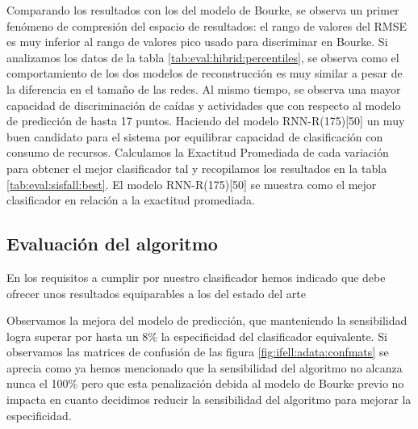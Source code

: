Comparando los resultados con los del modelo de Bourke, se observa un primer fenómeno de compresión del espacio de resultados: el rango de valores del RMSE es muy inferior al rango de valores pico usado para discriminar en Bourke. Si analizamos los datos de la tabla \ref{tab:eval:hibrid:percentiles}, se observa como el comportamiento de los dos modelos de reconstrucción es muy similar a pesar de la diferencia en el tamaño de las redes. Al mismo tiempo, se observa una mayor capacidad de discriminación de caídas y actividades que con respecto al modelo de predicción de hasta 17 puntos.  Haciendo del modelo RNN-R(175)[50] un muy buen candidato para el sistema por equilibrar capacidad de clasificación con consumo de recursos. Calculamos la Exactitud Promediada de cada variación para obtener el mejor clasificador tal y recopilamos los resultados en la tabla \ref{tab:eval:sisfall:best}. El modelo RNN-R(175)[50] se muestra como el mejor clasificador en relación a la exactitud promediada.



\subsection{Evaluación del algoritmo}




En los requisitos a cumplir por nuestro clasificador hemos indicado que debe ofrecer unos resultados equiparables a los del estado del arte 



Observamos la mejora del modelo de predicción, que manteniendo la sensibilidad logra superar por hasta un 8\% la especificidad del clasificador equivalente. Si observamos las matrices de confusión de las figura \ref{fig:ifell:adata:confmats}  se aprecia como ya hemos mencionado que la sensibilidad del algoritmo no alcanza nunca el 100\% pero que esta penalización debida al modelo de Bourke previo no impacta en cuanto decidimos reducir la sensibilidad del algoritmo para mejorar la especificidad.




